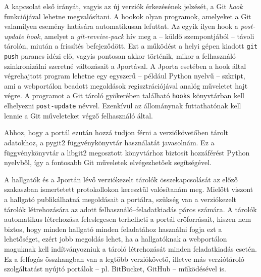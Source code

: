 A kapcsolat első irányát, vagyis az új verziók érkezésének jelzését, a Git \textit{hook} funkciójával lehetne megvalósítani.
A hookok olyan programok, amelyeket a Git valamilyen esemény hatására automatikusan lefuttat.
Az egyik ilyen hook a \textit{post-update hook}, amelyet a \textit{git-reveive-pack} hív meg a -- küldő szempontjából -- távoli tárolón, miután a frissítés befejeződött.
Ezt a működést a helyi gépen kiadott \texttt{git push} parancs idézi elő, vagyis pontosan akkor történik, mikor a felhasználó szinkronizálni szeretné változásait a Jportával.
\cite{GitHooks}
A Jporta esetében a hook által végrehajtott program lehetne egy egyszerű -- például Python nyelvű -- szkript, ami a webportálon beadott megoldások regisztrációjával analóg műveletet hajt végre.
A programot a Git tároló gyökerében található \texttt{hooks} könyvtárban kell elhelyezni \texttt{post-update} névvel.  %
Ezenkívül az állománynak futtathatónak kell lennie a Git műveleteket végző felhasználó által.

Ahhoz, hogy a portál ezután hozzá tudjon férni a verziókövetőben tárolt adatokhoz, a pygit2 függvénykönyvtár használatát javasolnám.
Ez a függvénykönyvtár a libgit2 megosztott könyvtárhoz biztosít hozzáférést Python nyelvből, így a fontosabb Git műveletek elvégezhetőek segítségével. \cite{pygit2}

A hallgatók és a Jportán lévő verziókezelt tárolók összekapcsolását az előző szakaszban ismertetett protokollokon keresztül valósítanám meg.
Mielőtt viszont a hallgató publikálhatná megoldásait a portálra, szükség van a verziókezelt tárolók létrehozására az adott felhasználó--feladatkiadás páros számára.
A tárolók automatikus létrehozása feleslegesen terhelheti a portál erőforrásait, hiszen nem biztos, hogy minden hallgató minden feladatához használni fogja ezt a lehetőséget, ezért jobb megoldás lehet, ha a hallgatóknak a webportálon maguknak kell indítványozniuk a tároló létrehozását minden feladatkiadás esetén.
Ez a felfogás összhangban van a legtöbb verziókövető, illetve más verziótároló szolgáltatást nyújtó portálok -- pl. BitBucket, GitHub -- működésével is.